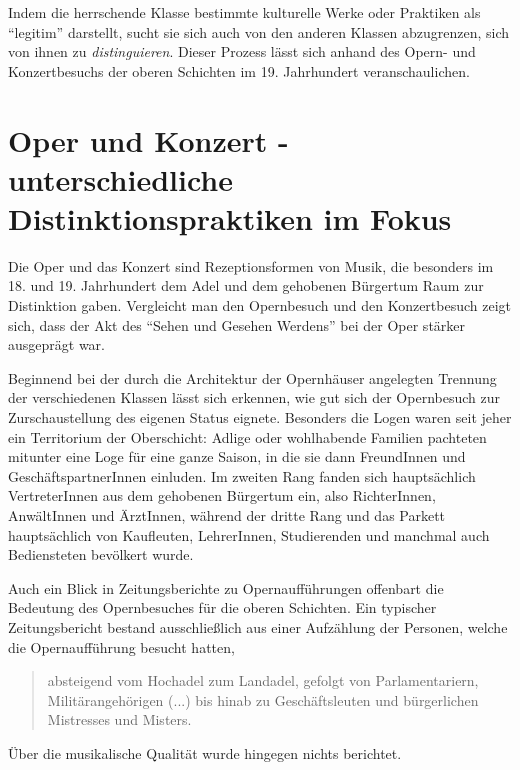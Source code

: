 \documentclass[a4paper, german, oneside]{scrbook}
\begin{document}
Indem die herrschende Klasse bestimmte kulturelle Werke oder Praktiken als \enquote{legitim} darstellt, sucht sie sich auch von den anderen Klassen abzugrenzen, sich von ihnen zu \emph{distinguieren}. Dieser Prozess lässt sich anhand des Opern- und Konzertbesuchs der oberen Schichten im 19. Jahrhundert veranschaulichen.


\section{Oper und Konzert - unterschiedliche Distinktionspraktiken im Fokus}
\label{operUndKonzert}

Die Oper und das Konzert sind Rezeptionsformen von Musik, die besonders im 18. und 19. Jahrhundert dem Adel und dem gehobenen Bürgertum Raum zur Distinktion gaben. Vergleicht man den Opernbesuch und den Konzertbesuch zeigt sich, dass der Akt des \enquote{Sehen und Gesehen Werdens} bei der Oper stärker ausgeprägt war.

Beginnend bei der durch die Architektur der Opernhäuser angelegten Trennung der verschiedenen Klassen lässt sich erkennen, wie gut sich der Opernbesuch zur Zurschaustellung des eigenen Status eignete. Besonders die Logen waren seit jeher ein Territorium der Oberschicht: Adlige oder wohlhabende Familien pachteten mitunter eine Loge für eine ganze Saison, in die sie dann FreundInnen und GeschäftspartnerInnen einluden. Im zweiten Rang fanden sich hauptsächlich VertreterInnen aus dem gehobenen Bürgertum ein, also RichterInnen, AnwältInnen und ÄrztInnen, während der dritte Rang und das Parkett hauptsächlich von Kaufleuten, LehrerInnen, Studierenden und manchmal auch Bediensteten bevölkert wurde. \parencite[vgl.][79]{muller_publikum_2014}

Auch ein Blick in Zeitungsberichte zu Opernaufführungen offenbart die Bedeutung des Opernbesuches für die oberen Schichten. Ein typischer Zeitungsbericht bestand ausschließlich aus einer Aufzählung der Personen, welche die Opernaufführung besucht hatten, \blockquote[{\cite[80]{muller_publikum_2014}}]{absteigend vom Hochadel zum Landadel, gefolgt von Parlamentariern, Militärangehörigen (...) bis hinab zu Geschäftsleuten und bürgerlichen Mistresses und Misters.} Über die musikalische Qualität wurde hingegen nichts berichtet.
\end{document}
